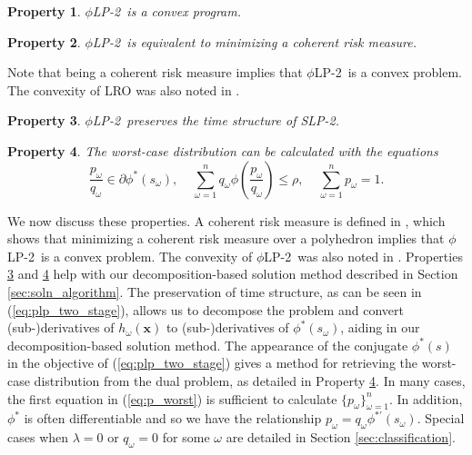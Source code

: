 \documentclass[opre,nonblindrev]{informs3} %
\newcommand{\x}{\mathbf{x}}
\newtheorem{property}{Property}
\newcommand{\plp}{$\phi$LP-2}
\begin{document}
\begin{property}
	\label{property:convex}
	\plp\ is a convex program.
\end{property}

\begin{property}
	\label{property:coherent_risk_measure}
	\plp\ is equivalent to minimizing a coherent risk measure.
\end{property}

Note that being a coherent risk measure implies that \plp\ is a convex problem.
The convexity of LRO was also noted in \cite{wang2010likelihood}.

\begin{property}
	\label{property:time_structure}
	\plp\ preserves the time structure of SLP-2.
\end{property}

\begin{property}
	\label{property:primal_dual_relation}
	The worst-case distribution can be calculated with the equations
	\begin{equation}\label{eq:p_worst}
		\frac{p_\omega}{q_\omega} \in \partial \phi^*\left(s_\omega\right), \ \ \ \ \ \sum_{\omega=1}^n q_\omega \phi\left(\frac{p_\omega}{q_\omega}\right) \leq \rho, \ \ \ \ \ \sum_{\omega=1}^n p_\omega = 1.
	\end{equation}
\end{property}

We now discuss these properties. A coherent risk measure is defined in \citep{rockafellar2007coherent}, which shows that minimizing a coherent risk measure over a polyhedron implies that \plp\ is a convex problem.
The convexity of \plp\ was also noted in \citep{bental2011robust}.
Properties \ref{property:time_structure} and \ref{property:primal_dual_relation} help with our decomposition-based solution method described in Section \ref{sec:soln_algorithm}. 
The preservation of time structure, as can be seen in (\ref{eq:plp_two_stage}), allows us to decompose the problem and convert (sub-)derivatives of $h_\omega(\x)$ to (sub-)derivatives of $\phi^*\left(s_\omega\right)$, aiding in our decomposition-based solution method. 
The appearance of the conjugate $\phi^*(s)$ in the objective of (\ref{eq:plp_two_stage}) gives a method for retrieving the worst-case distribution from the dual problem, as detailed in Property \ref{property:primal_dual_relation}.
In many cases, the first equation in (\ref{eq:p_worst}) is sufficient to calculate $\{p_\omega\}_{\omega=1}^n$.
In addition, $\phi^*$ is often differentiable and so we have the relationship $p_\omega = q_\omega \phi^{* \prime}(s_\omega)$.
Special cases when $\lambda = 0$ or $q_\omega = 0$ for some $\omega$ are detailed in Section \ref{sec:classification}.
\end{document}
